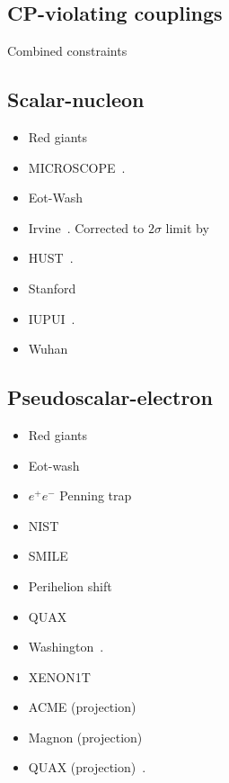 \documentclass[8pt,twocolumn]{extarticle}
\begin{document}
\newpage

\begin{mdframed}
\vspace{-1em}
\section{CP-violating couplings}\vspace{-0.5em}
Combined constraints~\cite{OHare:2020wah}
\subsection*{Scalar-nucleon}\vspace{-0.5em}
\begin{itemize}\setlength\itemsep{-0.5em}
	\item Red giants~\cite{Hardy:2016kme}
	\item MICROSCOPE~\cite{Berge:2017ovy}.
    \item Eot-Wash~\cite{Smith:1999cr,Kapner:2006si,Lee:2020zjt}
    \item Irvine~\cite{Hoskins:1985tn}. Corrected to $2\sigma$ limit by~\cite{Ke:2021jtj}
    \item HUST~\cite{Tu:2007zz,Yang:2012zzb,Tan:2020vpf,Tan:2016vwu}.
    \item Stanford~\cite{Geraci:2008hb}
    \item IUPUI~\cite{Chen:2014oda}.
    \item Wuhan~\cite{Ke:2021jtj}
\end{itemize}
\vspace{-2em}


\subsection*{Pseudoscalar-electron}\vspace{-0.5em}
\begin{itemize}\setlength\itemsep{-0.5em}
	\item Red giants~\cite{Hardy:2016kme}
	\item Eot-wash~\cite{Heckel:2008hw}
	\item $e^+ e^-$ Penning trap~\cite{Fan:2023hci}
    \item NIST~\cite{Wineland:1991zz}
    \item SMILE~\cite{Lee:2018vaq}
        \item Perihelion shift~\cite{Poddar:2023bgk}
   \item QUAX~\cite{Crescini:2016lwj,Crescini:2017uxs,Crescini:2020ykp}
    \item Washington~\cite{Terrano:2015sna,Hoedl:2011zz}.
    \item XENON1T~\cite{Aprile:2019xxb}
    \item ACME (projection)~\cite{Agrawal:2023lmw}
    \item Magnon (projection)~\cite{Mitridate:2020kly}
           \item QUAX (projection)~\cite{Crescini:2016lwj}.
\end{itemize}
\vspace{-2em}


\end{mdframed}
\end{document}
